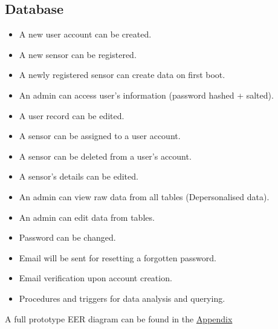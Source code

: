 \documentclass{article}
\begin{document}
            \subsection{Database}
            \begin{itemize}
                \item A new user account can be created.
                \item A new sensor can be registered.
                \item A newly registered sensor can create data on first boot.
                \item An admin can access user’s information (password hashed + salted).
                \item A user record can be edited.
                \item A sensor can be assigned to a user account.
                \item A sensor can be deleted from a user’s account.
                \item A sensor’s details can be edited.
                \item An admin can view raw data from all tables (Depersonalised data).
                \item An admin can edit data from tables.
                \item Password can be changed.
                \item Email will be sent for resetting a forgotten password.
                \item Email verification upon account creation.
                \item Procedures and triggers for data analysis and querying.
            \end{itemize}
            A full prototype EER diagram can be found in the \hyperref[sec:Appendix]{Appendix}

            \newpage
\end{document}
